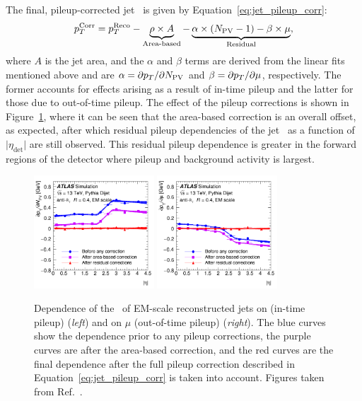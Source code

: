 The final, pileup-corrected jet \pT~is given by Equation~\ref{eq:jet_pileup_corr}:
\begin{align}
    p_{T}^{\text{Corr}} = p_{T}^{\text{Reco}} - \underbrace{\rho \times A}_{\text{Area-based}} - \underbrace{\alpha \times (N_{\text{PV}} - 1) - \beta \times \mu}_{\text{Residual}},
    \label{eq:jet_pileup_corr}
\end{align}
where $A$ is the jet area, and the $\alpha$ and $\beta$ terms are derived from the linear fits mentioned above and are $\alpha = \partial p_{T} / \partial N_{\text{PV}}$
and $\beta = \partial p_{T} / \partial \mu$, respectively.
The former accounts for effects arising as a result of in-time pileup and the latter for those due to out-of-time pileup.
The effect of the pileup corrections is shown in Figure~\ref{fig:jet_pileup_corr}, where it can be seen that the area-based correction
is an overall offset, as expected, after which residual pileup dependencies of the jet \pT~as a function of $\lvert \eta_{\text{det}} \rvert$ are still observed.
This residual pileup dependence is greater in the forward regions of the detector where pileup and background activity is largest.

\begin{figure}[!htb]
    \begin{center}
        \includegraphics[width=0.4\textwidth]{figures/chapter3/jets/jet_pileup_corr_alpha}
        \includegraphics[width=0.4\textwidth]{figures/chapter3/jets/jet_pileup_corr_beta}
        \caption{
            Dependence of the \pT~of EM-scale reconstructed jets on \npv (in-time pileup) (\textit{left}) and on
            $\mu$ (out-of-time pileup) (\textit{right}).
            The blue curves show the dependence prior to any pileup corrections,
            the purple curves are after the area-based correction,
            and the red curves are the final dependence after the full pileup correction described in Equation~\ref{eq:jet_pileup_corr}
            is taken into account.
            Figures taken from Ref.~\cite{Aaboud:2017jcu}.
        }
        \label{fig:jet_pileup_corr}
    \end{center}
\end{figure}

